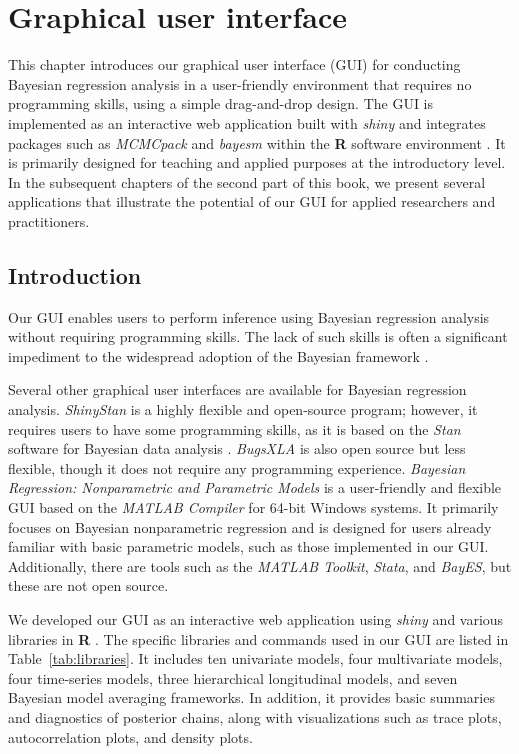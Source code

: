 \chapter{Graphical user interface}\label{chapGUI}

This chapter introduces our graphical user interface (GUI) for conducting Bayesian regression analysis in a user-friendly environment that requires no programming skills, using a simple drag-and-drop design. The GUI is implemented as an interactive web application built with \textit{shiny} \cite{Chang2018} and integrates packages such as \textit{MCMCpack} \cite{Martin2018} and \textit{bayesm} \cite{Rossi2017} within the \textbf{R} software environment \cite{R2023}. It is primarily designed for teaching and applied purposes at the introductory level. In the subsequent chapters of the second part of this book, we present several applications that illustrate the potential of our GUI for applied researchers and practitioners.


\section{Introduction}\label{secGUI1}

Our GUI enables users to perform inference using Bayesian regression analysis without requiring programming skills. The lack of such skills is often a significant impediment to the widespread adoption of the Bayesian framework \cite{Woodward2005,Karabatsos2016}.

Several other graphical user interfaces are available for Bayesian regression analysis. \textit{ShinyStan} \cite{shinystan2017} is a highly flexible and open-source program; however, it requires users to have some programming skills, as it is based on the \textit{Stan} software for Bayesian data analysis \cite{carpenter2017stan}. \textit{BugsXLA} \cite{Woodward2005} is also open source but less flexible, though it does not require any programming experience. \textit{Bayesian Regression: Nonparametric and Parametric Models} \cite{Karabatsos2016} is a user-friendly and flexible GUI based on the \textit{MATLAB Compiler} for 64-bit Windows systems. It primarily focuses on Bayesian nonparametric regression and is designed for users already familiar with basic parametric models, such as those implemented in our GUI. Additionally, there are tools such as the \textit{MATLAB Toolkit}, \textit{Stata}, and \textit{BayES}, but these are not open source.

We developed our GUI as an interactive web application using \textit{shiny} \cite{Chang2018} and various libraries in \textbf{R} \cite{R2021}. The specific libraries and commands used in our GUI are listed in Table~\ref{tab:libraries}. It includes ten univariate models, four multivariate models, four time-series models, three hierarchical longitudinal models, and seven Bayesian model averaging frameworks. In addition, it provides basic summaries and diagnostics of posterior chains, along with visualizations such as trace plots, autocorrelation plots, and density plots.

